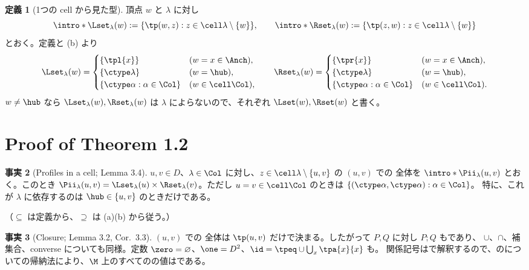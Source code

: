 \documentclass[11pt,a4paper]{ltjsarticle}
\theoremstyle{definition}
\newtheorem{definition}{定義}
\newtheorem{fact}[definition]{事実}
\begin{document}
\begin{definition}[1つの cell から見た型]
頂点 $w$ と $\lambda$ に対し
\[
 \intro*\Lset_\lambda(w):=\{\tp(w,z):z\in\cell\lambda\setminus\{w\}\},\qquad
 \intro*\Rset_\lambda(w):=\{\tp(z,w):z\in\cell\lambda\setminus\{w\}\}
\]
とおく。定義と  (b) より
\[
 \Lset_\lambda(w)=
 \begin{cases}
  \{\tpl{x}\}&(w=x\in \Anch),\\
  \{\ctype\lambda\}&(w=\hub),\\
  \{\ctype\alpha:\alpha\in\Col\}&(w\in\cell\Col),
 \end{cases}
 \qquad
 \Rset_\lambda(w)=
 \begin{cases}
  \{\tpr{x}\}&(w=x\in \Anch),\\
  \{\ctype\lambda\}&(w=\hub),\\
  \{\ctype\alpha:\alpha\in\Col\}&(w\in\cell\Col).
 \end{cases}
\]
$w\ne \hub$ なら $\Lset_\lambda(w),\Rset_\lambda(w)$ は $\lambda$ によらないので、それぞれ $\Lset(w),\Rset(w)$ と書く。
\end{definition}

\section{Proof of Theorem 1.2}
\begin{fact}[Profiles in a cell; Lemma 3.4]\label{f:P1}
$u,v\in D$、$\lambda\in\Col$ に対し、$z\in\cell\lambda\setminus\{u,v\}$ の $(u,v)$ での  全体を $\intro*\Pii_\lambda(u,v)$ とおく。このとき
$\Pii_\lambda(u,v)=\Lset_\lambda(u)\times \Rset_\lambda(v)$。ただし $u=v\in\cell\Col$ のときは $\{(\ctype\alpha,\ctype\alpha):\alpha\in\Col\}$。
特に、これが $\lambda$ に依存するのは $\hub\in\{u,v\}$ のときだけである。
\end{fact}
（$\subseteq$ は定義から、$\supseteq$ は  (a)(b) から従う。）

\begin{fact}[Closure; Lemma 3.2, Cor.~3.3]\label{f:closure}
$(u,v)$ での  全体は $\tp(u,v)$ だけで決まる。したがって $P,Q$ に対し $P;Q$ もであり、
$\cup$、$\cap$、補集合、converse についても同様。定数 $\zero=\varnothing$、$\one=D^2$、$\id=\tpeq\cup\bigcup_x\tpa{x}{x}$ も。
関係記号はで解釈するので、のについての帰納法により、$\M$ 上のすべてのの値はである。
\end{fact}
\end{document}
